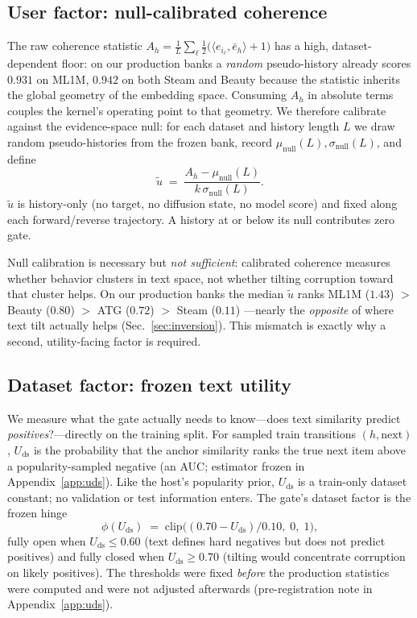 \documentclass[letterpaper]{article}
\newcommand{\ut}{\tilde{u}}
\newcommand{\Uds}{U_{\mathrm{ds}}}
\newcommand{\phids}{\phi(\Uds)}
\begin{document}
\subsection{User factor: null-calibrated coherence}
\label{sec:null}
The raw coherence statistic
$A_h=\frac{1}{L}\sum_{\ell}\tfrac{1}{2}\big(\langle e_{i_\ell},\bar
e_h\rangle+1\big)$ has a high, dataset-dependent floor: on our
production banks a \emph{random} pseudo-history already scores
$0.931$ on ML1M, $0.942$ on both Steam and Beauty
because the statistic inherits the global geometry of the embedding
space. Consuming $A_h$ in absolute terms couples the kernel's operating
point to that geometry. We therefore calibrate against the
evidence-space null: for each dataset and history length $L$ we draw
random pseudo-histories from the frozen bank, record
$\mu_{\mathrm{null}}(L),\sigma_{\mathrm{null}}(L)$, and define
\begin{equation}
  \ut \;=\;
  \frac{A_h-\mu_{\mathrm{null}}(L)}{k\,\sigma_{\mathrm{null}}(L)} .
  \label{eq:utilde}
\end{equation}
$\ut$ is history-only (no target, no diffusion state, no model score)
and fixed along each forward/reverse trajectory. A history at or below
its null contributes zero gate.

Null calibration is necessary but \emph{not sufficient}: calibrated
coherence measures whether behavior clusters in text space, not whether
tilting corruption toward that cluster helps. On our production banks
the median $\ut$ ranks ML1M ($1.43$) $>$ Beauty ($0.80$) $>$ ATG
($0.72$) $>$ Steam ($0.11$)
---nearly the \emph{opposite} of where text tilt actually helps
(Sec.~\ref{sec:inversion}). This mismatch is exactly why a second,
utility-facing factor is required.

\subsection{Dataset factor: frozen text utility}
\label{sec:uds}
We measure what the gate actually needs to know---does text similarity
predict \emph{positives}?---directly on the training split. For sampled
train transitions $(h,\text{next})$, $\Uds$ is the probability that the
anchor similarity ranks the true next item above a popularity-sampled
negative (an AUC; estimator frozen in Appendix~\ref{app:uds}). Like the
host's popularity prior, $\Uds$ is a train-only dataset constant; no
validation or test information enters. The gate's dataset factor is the
frozen hinge
\begin{equation}
  \phids \;=\; \mathrm{clip}\!\big((0.70-\Uds)/0.10,\;0,\;1\big),
  \label{eq:phi}
\end{equation}
fully open when $\Uds\le 0.60$ (text defines hard negatives but does
not predict positives) and fully closed when $\Uds\ge 0.70$ (tilting
would concentrate corruption on likely positives). The thresholds were
fixed \emph{before} the production statistics were computed and were
not adjusted afterwards (pre-registration note in
Appendix~\ref{app:uds}).
\end{document}
